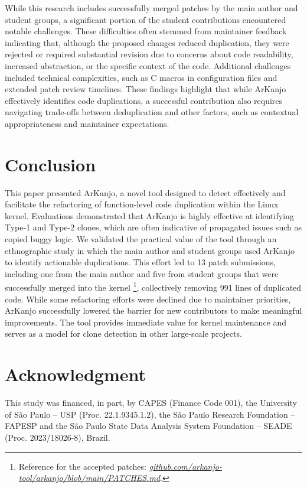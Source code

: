\documentclass[conference]{IEEEtran}
\begin{document}
While this research includes successfully merged patches by the main author and student groups,
a significant portion of the student contributions encountered notable challenges. These difficulties 
often stemmed from maintainer feedback indicating that, although the proposed changes reduced duplication, 
they were rejected or required substantial revision due to concerns about code readability, increased abstraction, 
or the specific context of the code. Additional challenges included technical complexities, such as C macros in 
configuration files and extended patch review timelines. These findings highlight that while ArKanjo 
effectively identifies code duplications, a successful 
contribution also requires navigating trade-offs between deduplication and other factors, such as 
contextual appropriateness and maintainer expectations.


\section{Conclusion}

This paper presented ArKanjo, a novel tool designed to detect effectively 
and facilitate the refactoring of function-level code duplication within the Linux kernel. 
Evaluations demonstrated that ArKanjo is highly effective at identifying Type-1 and Type-2 
clones, which are often indicative of propagated issues such as copied buggy logic. We validated the practical 
value of the tool through an ethnographic study in which the main author and student 
groups used ArKanjo to identify actionable duplications. This effort led to 13 patch submissions, 
including one from the main author and five from student groups that were successfully merged into 
the kernel
\footnote{Reference for the accepted patches:  
\textit{\href{https://github.com/arkanjo-tool/arkanjo/blob/main/PATCHES.md}{github.com/arkanjo-tool/arkanjo/blob/main/PATCHES.md}}.
}, 
collectively removing 991 lines of duplicated code. While some refactoring 
efforts were declined due to maintainer priorities, ArKanjo successfully lowered the barrier 
for new contributors to make meaningful improvements. The tool provides immediate value for 
kernel maintenance and serves as a model for clone detection in other large-scale projects.

\section*{Acknowledgment}

This study was financed, in part, by CAPES (Finance Code 001), the University of São Paulo – USP (Proc. 22.1.9345.1.2), the São Paulo Research Foundation – FAPESP and the São Paulo State Data Analysis System Foundation – SEADE (Proc. 2023/18026-8), Brazil.

\newpage


\end{document}
